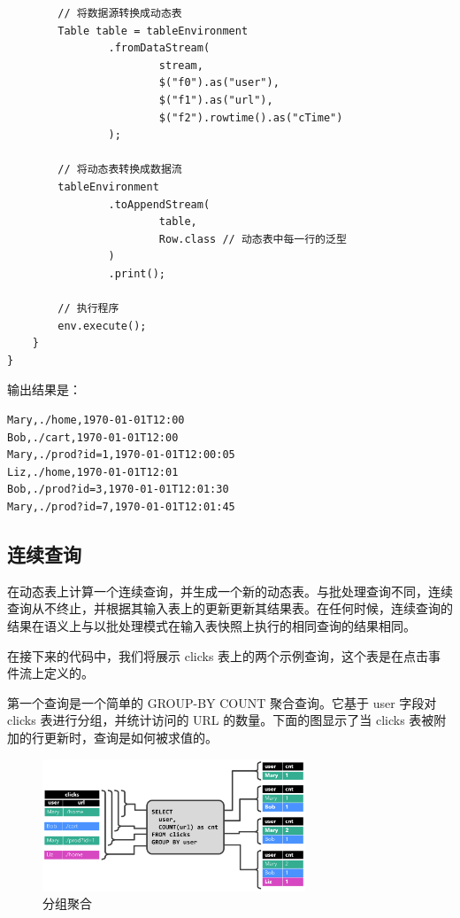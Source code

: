 \documentclass[cn,11pt,chinese]{elegantbook}
\begin{document}
\begin{verbatim}
        // 将数据源转换成动态表
        Table table = tableEnvironment
                .fromDataStream(
                        stream,
                        $("f0").as("user"),
                        $("f1").as("url"),
                        $("f2").rowtime().as("cTime")
                );

        // 将动态表转换成数据流
        tableEnvironment
                .toAppendStream(
                        table,
                        Row.class // 动态表中每一行的泛型
                )
                .print();

        // 执行程序
        env.execute();
    }
}
\end{verbatim}

输出结果是：

\begin{verbatim}
Mary,./home,1970-01-01T12:00
Bob,./cart,1970-01-01T12:00
Mary,./prod?id=1,1970-01-01T12:00:05
Liz,./home,1970-01-01T12:01
Bob,./prod?id=3,1970-01-01T12:01:30
Mary,./prod?id=7,1970-01-01T12:01:45
\end{verbatim}

\subsection{连续查询}

在动态表上计算一个连续查询，并生成一个新的动态表。与批处理查询不同，连续查询从不终止，并根据其输入表上的更新更新其结果表。在任何时候，连续查询的结果在语义上与以批处理模式在输入表快照上执行的相同查询的结果相同。

在接下来的代码中，我们将展示 clicks 表上的两个示例查询，这个表是在点击事件流上定义的。

第一个查询是一个简单的 GROUP-BY COUNT 聚合查询。它基于 user 字段对 clicks 表进行分组，并统计访问的 URL 的数量。下面的图显示了当 clicks 表被附加的行更新时，查询是如何被求值的。

\begin{figure}[htbp]
    \centering
    \includegraphics[width=0.7\textwidth]{images/query-groupBy-cnt.png}
    \caption{分组聚合}
\end{figure}
\end{document}
